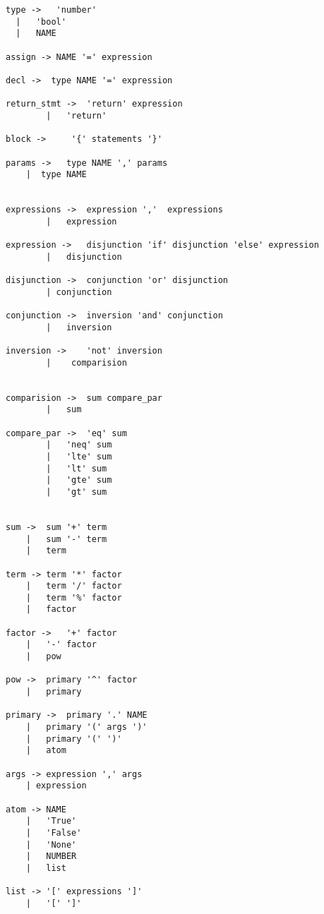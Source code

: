 \begin{verbatim}
type ->   'number'        
  |   'bool'          
  |   NAME            

assign -> NAME '=' expression                         

decl ->  type NAME '=' expression                              

return_stmt ->  'return' expression                                      
        |   'return'                                        

block ->     '{' statements '}'   

params ->   type NAME ',' params      
    |  type NAME                  


expressions ->  expression ','  expressions               
        |   expression                                

expression ->   disjunction 'if' disjunction 'else' expression            
        |   disjunction                                                

disjunction ->  conjunction 'or' disjunction                                
        | conjunction                                                   

conjunction ->  inversion 'and' conjunction                                 
        |   inversion                                                   

inversion ->    'not' inversion                                             
        |    comparision                                                


comparision ->  sum compare_par                                            
        |   sum

compare_par ->  'eq' sum                        
        |   'neq' sum                       
        |   'lte' sum                       
        |   'lt' sum                        
        |   'gte' sum                       
        |   'gt' sum                        


sum ->  sum '+' term                            
    |   sum '-' term                            
    |   term 

term -> term '*' factor                         
    |   term '/' factor                         
    |   term '%' factor                         
    |   factor

factor ->   '+' factor
    |   '-' factor
    |   pow

pow ->  primary '^' factor              
    |   primary

primary ->  primary '.' NAME            
    |   primary '(' args ')'        
    |   primary '(' ')'             
    |   atom

args -> expression ',' args
    | expression

atom -> NAME                            
    |   'True'                          
    |   'False'                         
    |   'None'                          
    |   NUMBER                          
    |   list

list -> '[' expressions ']'             
    |   '[' ']'                         
\end{verbatim}

